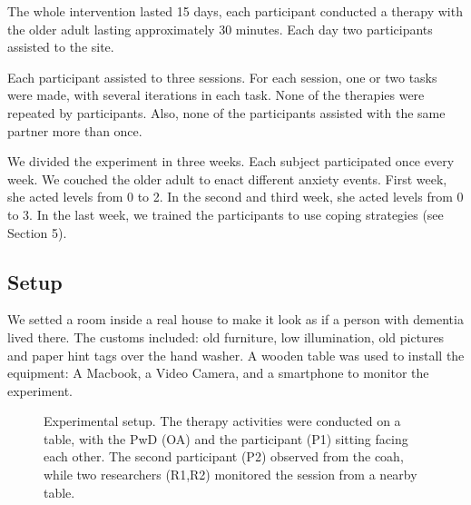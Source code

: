 The whole intervention lasted 15 days, each participant
conducted a therapy with the older adult lasting approximately
30 minutes. Each day two participants assisted to the site. 

Each participant assisted to three sessions.
For each session, one or two tasks were made, with several
iterations in each task. None of the therapies were repeated
by participants. Also, none of the participants assisted with
the same partner more than once.

We divided the experiment in three weeks.
Each subject participated once every week.
We couched the older adult to enact different anxiety events.
First week, she acted levels from 0 to 2. In the second and 
third week, she acted levels from 0 to 3. In the last week,
we trained the participants to use coping strategies
(see Section 5).
\subsection{Setup}
We setted a room inside a real house to make it look as if
a person with dementia lived there. The customs included:
old furniture, low illumination, old pictures and paper 
hint tags over the hand washer. A wooden table was used 
to install the equipment: A Macbook, a Video Camera, and 
a smartphone to monitor the experiment. 

\begin{figure}[h]
        \centering
        \caption{Experimental setup.
        The therapy activities were conducted
        on a table, with the PwD (OA) and the participant
        (P1) sitting facing each other. The second participant
        (P2) observed from the coah, while two researchers 
        (R1,R2) monitored the session from a nearby table.}
        \label{fig:img_exp_setup}
\end{figure}

